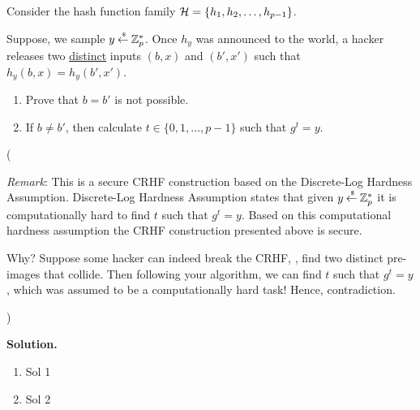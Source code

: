 \documentclass[11pt]{article}
\begin{document}
\begin{enumerate}
  Consider the hash function family ${\mathcal H} = \{h_1,h_2,\dotsc,h_{p-1}\}$. 
  
  Suppose, we sample $y\mathbin{\stackrel{\mbox{\,\tiny \$}}{\gets}}{\mathbb Z}_p^*$.
  Once $h_y$ was announced to the world, a hacker releases two \underline{distinct} inputs $(b,x)$ and $(b',x')$ such that $h_y(b,x)=h_y(b',x')$. 
  
  \begin{enumerate}
  \item Prove that $b=b'$ is not possible. 
  \item If $b\neq b'$, then calculate $t\in\{0,1,\dotsc,p-1\}$ such that $g^t=y$. 
  \end{enumerate}
  
  ({\footnotesize{\em Remark}: This is a secure CRHF construction based on the Discrete-Log Hardness Assumption. Discrete-Log Hardness Assumption states that given $y\mathbin{\stackrel{\mbox{\,\tiny \$}}{\gets}}{\mathbb Z}_p^*$ it is computationally hard to find $t$ such that $g^t=y$. Based on this computational hardness assumption the CRHF construction presented above is secure. 
  
  Why? Suppose some hacker can indeed break the CRHF, \ie, find two distinct pre-images that collide. Then following your algorithm, we can find $t$ such that $g^t=y$, which was assumed to be a computationally hard task! Hence, contradiction.}) 

  {\bfseries Solution.} 
  \begin{enumerate}
  \item Sol 1
  \item Sol 2 
  \end{enumerate}

 
 



\end{enumerate}
\end{document}
